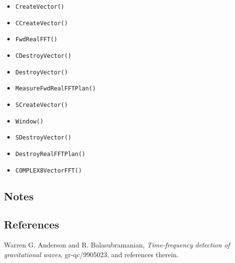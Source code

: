 \documentclass{article}
\begin{document}

\begin{itemize}
\item\texttt{CreateVector()}
\item\texttt{CCreateVector()}
\item\texttt{FwdRealFFT()}
\item\texttt{CDestroyVector()}
\item\texttt{DestroyVector()}
\item\texttt{MeasureFwdRealFFTPlan()}
\item\texttt{SCreateVector()}
\item\texttt{Window()}
\item\texttt{SDestroyVector()}
\item\texttt{DestroyRealFFTPlan()}
\item\texttt{COMPLEX8VectorFFT()}
\end{itemize}

\subsection{Notes}

\subsection{References}

\begin{thebibliography}{0}

Warren G. Anderson and R. Balasubramanian, \textit{Time-frequency
detection of gravitational waves}, gr-qc/9905023, and references
therein. 

\end{thebibliography}
\end{document}
